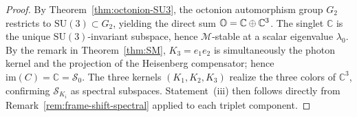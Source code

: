 \begin{proof}
By Theorem~\ref{thm:octonion-SU3}, the octonion automorphism group $G_2$
restricts to $\mathrm{SU}(3)\subset G_2$, yielding the direct sum
$\mathbb{O} = \mathbb{C}\oplus\mathbb{C}^3$. The singlet $\mathbb{C}$ is the
unique $\mathrm{SU}(3)$-invariant subspace, hence $\mathcal{M}$-stable at
a scalar eigenvalue $\lambda_0$. By the remark in
Theorem~\ref{thm:SM}, $K_3 = e_1 e_2$ is simultaneously the photon kernel
and the projection of the Heisenberg compensator; hence
$\mathrm{im}(C) = \mathbb{C} = \mathcal{S}_0$. The three kernels
$(K_1,K_2,K_3)$ realize the three colors of $\mathbb{C}^3$, confirming
$\mathcal{S}_{K_i}$ as spectral subspaces. Statement~(iii) then follows
directly from Remark~\ref{rem:frame-shift-spectral} applied to each
triplet component.
\end{proof}


